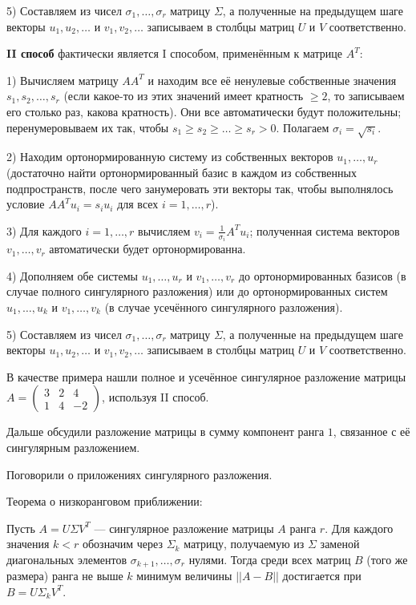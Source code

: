 \documentclass[10pt, a4paper]{extarticle}
\theoremstyle{definition}
\begin{document}
5) Составляем из чисел $\sigma_1,\ldots, \sigma_r$ матрицу $\Sigma$, а полученные на предыдущем шаге векторы $u_1,u_2, \ldots$ и $v_1,v_2,\ldots$ записываем в столбцы матриц $U$ и $V$ соответственно.


\textbf{II способ} фактически является I способом, применённым к матрице $A^T$: 

1) Вычисляем матрицу $AA^T$ и находим все её ненулевые собственные значения $s_1, s_2, \ldots, s_r$ (если какое-то из этих значений имеет кратность $\geqslant 2$, 
то записываем его столько раз, какова кратность). Они все автоматически будут положительны; перенумеровываем их так, чтобы $s_1 \geqslant s_2 \geqslant \ldots \geqslant s_r > 0$. 
Полагаем $\sigma_i = \sqrt{s_i}$.

2) Находим ортонормированную систему из собственных векторов $u_1,\ldots,u_r$ (достаточно найти ортонормированный базис в каждом из собственных подпространств, 
после чего занумеровать эти векторы так, чтобы выполнялось условие $AA^Tu_i = s_iu_i$ для всех $i = 1,\ldots, r$).

3) Для каждого $i = 1,\ldots, r$ вычисляем $v_i = \frac1{\sigma_i}A^Tu_i$; полученная система векторов $v_1,\ldots, v_r$ автоматически будет ортонормированна.

4) Дополняем обе системы $u_1,\ldots, u_r$ и $v_1,\ldots, v_r$ до ортонормированных базисов (в случае полного сингулярного разложения) или до ортонормированных систем 
$u_1,\ldots, u_k$ и $v_1,\ldots, v_k$ (в случае усечённого сингулярного разложения).

5) Составляем из чисел $\sigma_1,\ldots, \sigma_r$ матрицу $\Sigma$, а полученные на предыдущем шаге векторы $u_1,u_2, \ldots$ и $v_1,v_2,\ldots$ записываем в столбцы матриц $U$ и $V$ соответственно.

В качестве примера нашли полное и усечённое сингулярное разложение матрицы $A = \begin{pmatrix} 3 & 2 & 4 \\ 1 & 4 & -2 \end{pmatrix}$, используя II способ.

Дальше обсудили разложение матрицы в сумму компонент ранга $1$, связанное с её сингулярным разложением.

Поговорили о приложениях сингулярного разложения.

Теорема о низкоранговом приближении:

Пусть $A = U \Sigma V^T$ --- сингулярное разложение матрицы $A$ ранга $r$.
Для каждого значения $k < r$ обозначим через $\Sigma_k$ матрицу, получаемую из $\Sigma$ заменой диагональных элементов $\sigma_{k+1}, \ldots, \sigma_r$ нулями.
Тогда среди всех матриц $B$ (того же размера) ранга не выше $k$ минимум величины $||A-B||$ достигается при $B = U\Sigma_kV^T$.
\end{document}
